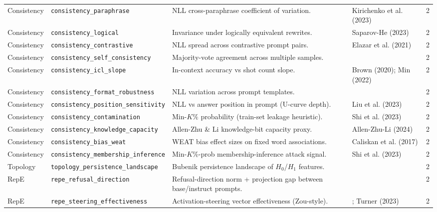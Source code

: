 \documentclass[preprint]{neurips_2025}
\begin{document}
\begin{longtable}{@{}llp{7.3cm}ll@{}}
Consistency & \texttt{consistency\_paraphrase} & NLL cross-paraphrase coefficient of variation. & Kirichenko et al. (2023) & 2 \\
Consistency & \texttt{consistency\_logical} & Invariance under logically equivalent rewrites. & Saparov-He (2023) & 2 \\
Consistency & \texttt{consistency\_contrastive} & NLL spread across contrastive prompt pairs. & Elazar et al. (2021) & 2 \\
Consistency & \texttt{consistency\_self\_consistency} & Majority-vote agreement across multiple samples. & \citet{wang2022self} & 2 \\
Consistency & \texttt{consistency\_icl\_slope} & In-context accuracy vs shot count slope. & Brown (2020); Min (2022) & 2 \\
Consistency & \texttt{consistency\_format\_robustness} & NLL variation across prompt templates. & \citet{sclar2023quantifying} & 2 \\
Consistency & \texttt{consistency\_position\_sensitivity} & NLL vs answer position in prompt (U-curve depth). & Liu et al. (2023) & 2 \\
Consistency & \texttt{consistency\_contamination} & Min-$K\%$ probability (train-set leakage heuristic). & Shi et al. (2023) & 2 \\
Consistency & \texttt{consistency\_knowledge\_capacity} & Allen-Zhu \& Li knowledge-bit capacity proxy. & Allen-Zhu-Li (2024) & 2 \\
Consistency & \texttt{consistency\_bias\_weat} & WEAT bias effect sizes on fixed word associations. & Caliskan et al. (2017) & 2 \\
Consistency & \texttt{consistency\_membership\_inference} & Min-$K\%$-prob membership-inference attack signal. & Shi et al. (2023) & 2 \\
\midrule
Topology & \texttt{topology\_persistence\_landscape} & Bubenik persistence landscape of $H_0$/$H_1$ features. & \citet{bubenik2015statistical} & 2 \\
\midrule
RepE & \texttt{repe\_refusal\_direction} & Refusal-direction norm + projection gap between base/instruct prompts. & \citet{arditi2024refusal} & 2 \\
RepE & \texttt{repe\_steering\_effectiveness} & Activation-steering vector effectiveness (Zou-style). & \citet{zou2023representation}; Turner (2023) & 2 \\
\end{longtable}
\label{app:models}
\end{document}
